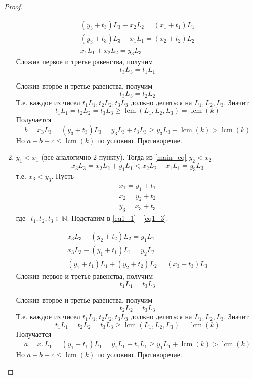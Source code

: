 \documentclass{article}
\DeclareMathOperator{\lcm}{lcm}
\begin{document}
\begin{proof}
\begin{enumerate}
			\begin{equation*}
			\begin{gathered}
			(y_3 + t_3) L_3 - x_2 L_2 = (x_1 + t_1) L_1\\
			(y_3 + t_3) L_3 - x_1 L_1 = (x_2 + t_2) L_2\\
			x_1 L_1 + x_2 L_2 = y_3 L_3
			\end{gathered}
			\end{equation*}
			Сложив первое и третье равенства, получим 
			$$
			t_3 L_3 = t_1 L_1
			$$
			
			Сложив второе и третье равенства, получим $$t_3 L_3 = t_2 L_2$$
			Т.е. каждое из чисел $t_1 L_1, t_2 L_2, t_3 L_3$ должно делиться на $L_1, L_2, L_3$. 
			Значит $$t_1 L_1 = t_2 L_2 = t_3 L_3 \ge \lcm(L_1, L_2, L_3) = \lcm(k)$$
			Получается
			$$
			b = x_3 L_3 = (y_3 + t_3) L_3 = y_3 L_3 + t_3 L_3 \ge y_3 L_3 + \lcm(k) > \lcm(k)
			$$
			Но $a + b + c \le \lcm(k)$ по условию. Противоречие.
			
		\item 
			$y_1 < x_1$ (все аналогично 2 пункту). Тогда из \eqref{main_eq} $y_2 < x_2$
			$$
			x_3 L_3 = x_2 L_2 + y_1 L_1 < x_2 L_2 + x_1 L_1 = y_3 L_3
			$$ т.е. $x_3 < y_3$.
			Пусть 
			\begin{equation*}
			\begin{gathered}
			x_1 = y_1 + t_1\\
			x_2 = y_2 + t_2\\	 
			y_3 = x_3 + t_3
			\end{gathered}
			\end{equation*}
			где $\hspace{5pt} t_1, t_2, t_3 \in \mathbb{N}$.
			Подставим в \eqref{eq1_1} - \eqref{eq1_3}:
			
			\begin{equation*} 
			\begin{gathered}
			x_3 L_3 - (y_2 + t_2) L_2 = y_1 L_1\\
			x_3 L_3 - (y_1 + t_1) L_1 = y_2 L_2\\
			(y_1 + t_1) L_1 + (y_2 + t_2) L_2 = (x_3 + t_3) L_3
			\end{gathered}
			\end{equation*}
			Сложив первое и третье равенства, получим 
			$$
			t_1 L_1 = t_3 L_3
			$$
			
			Сложив второе и третье равенства, получим $$t_2 L_2 = t_3 L_3$$
			Т.е. каждое из чисел $t_1 L_1, t_2 L_2, t_3 L_3$ должно делиться на $L_1, L_2, L_3$. 
			Значит $$t_1 L_1 = t_2 L_2 = t_3 L_3 \ge \lcm(L_1, L_2, L_3) = \lcm(k)$$
			Получается
			$$
			a = x_1 L_1 = (y_1 + t_1) L_1 = y_1 L_1 + t_1 L_1 \ge y_1 L_1 + \lcm(k) > \lcm(k)
			$$
			Но $a + b + c \le \lcm(k)$ по условию. Противоречие.
		\end{enumerate}
		
	\end{proof}
\end{document}
